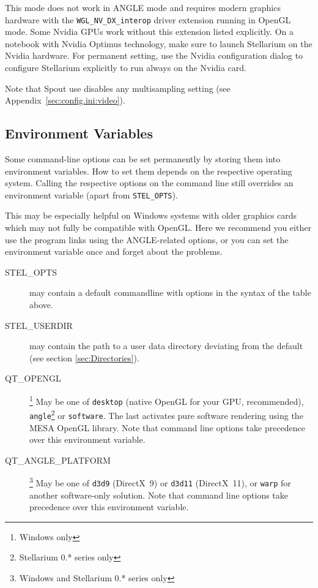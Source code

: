 This mode does not work in ANGLE mode and requires modern graphics hardware with the \texttt{WGL\_NV\_DX\_interop} 
driver extension running in OpenGL mode. Some Nvidia GPUs work without this extension listed explicitly. 
On a notebook with Nvidia Optimus technology, make sure to launch Stellarium on the Nvidia hardware. 
For permanent setting, use the Nvidia configuration dialog to configure Stellarium explicitly to run always on the Nvidia card.

Note that Spout use disables any multisampling setting (see Appendix~\ref{sec:config.ini:video}). 

\subsection{Environment Variables}
\label{sec:Environment}

Some command-line options can be set permanently by storing them into
environment variables. How to set them depends on the respective
operating system. Calling the respective options on the command line
still overrides an environment variable (apart from
\texttt{STEL\_OPTS}).

This may be especially helpful on Windows systems with older graphics
cards which may not fully be compatible with OpenGL. Here we recommend
you either use the program links using the ANGLE-related options, or
you can set the environment variable once and forget about the
problems.

\begin{description}
\item[STEL\_OPTS] may contain a default commandline with options in the syntax of the table above.
\item[STEL\_USERDIR] may contain the path to a user data directory
  deviating from the default (see section \ref{sec:Directories}).
\item[QT\_OPENGL]\footnote{Windows only} May be one of \texttt{desktop} (native OpenGL for your GPU, recommended),
  \texttt{angle}\footnote{Stellarium 0.* series only} or \texttt{software}. The last activates pure software rendering using the MESA OpenGL library. Note that command line options take precedence over this environment variable.
\item[QT\_ANGLE\_PLATFORM]\footnote{Windows and Stellarium 0.* series only} May be one of \texttt{d3d9} (DirectX~9) or \texttt{d3d11} (DirectX~11),
  or \texttt{warp} for another software-only solution. Note that command line options take precedence over this environment variable.
\end{description}



